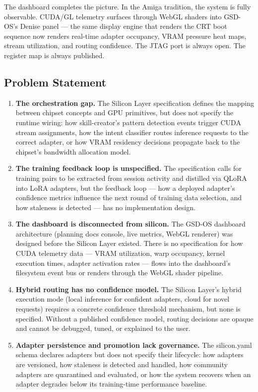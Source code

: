 \documentclass[11pt,letterpaper]{article}
\begin{document}
The dashboard completes the picture. In the Amiga tradition, the system is fully observable. CUDA/GL telemetry surfaces through WebGL shaders into GSD-OS's Denise panel --- the same display engine that renders the CRT boot sequence now renders real-time adapter occupancy, VRAM pressure heat maps, stream utilization, and routing confidence. The JTAG port is always open. The register map is always published.

\subsection{Problem Statement}

\begin{enumerate}[leftmargin=*, label=\textbf{\arabic*.}]

\item \textbf{The orchestration gap.} The Silicon Layer specification defines the mapping between chipset concepts and GPU primitives, but does not specify the runtime wiring: how skill-creator's pattern detection events trigger CUDA stream assignments, how the intent classifier routes inference requests to the correct adapter, or how VRAM residency decisions propagate back to the chipset's bandwidth allocation model.

\item \textbf{The training feedback loop is unspecified.} The specification calls for training pairs to be extracted from session activity and distilled via QLoRA into LoRA adapters, but the feedback loop --- how a deployed adapter's confidence metrics influence the next round of training data selection, and how staleness is detected --- has no implementation design.

\item \textbf{The dashboard is disconnected from silicon.} The GSD-OS dashboard architecture (planning docs console, live metrics, WebGL renderer) was designed before the Silicon Layer existed. There is no specification for how CUDA telemetry data --- VRAM utilization, warp occupancy, kernel execution times, adapter activation rates --- flows into the dashboard's filesystem event bus or renders through the WebGL shader pipeline.

\item \textbf{Hybrid routing has no confidence model.} The Silicon Layer's hybrid execution mode (local inference for confident adapters, cloud for novel requests) requires a concrete confidence threshold mechanism, but none is specified. Without a published confidence model, routing decisions are opaque and cannot be debugged, tuned, or explained to the user.

\item \textbf{Adapter persistence and promotion lack governance.} The silicon.yaml schema declares adapters but does not specify their lifecycle: how adapters are versioned, how staleness is detected and handled, how community adapters are quarantined and evaluated, or how the system recovers when an adapter degrades below its training-time performance baseline.

\end{enumerate}
\end{document}

